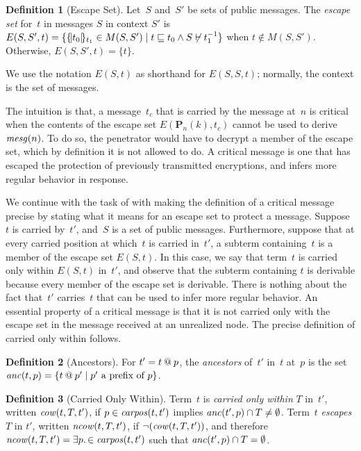 \documentclass[12pt]{article}
\theoremstyle{definition}
\newtheorem{defn}{Definition}[section]
\newcommand{\pubmsg}{\mathbf{P}}
\newcommand{\carpos}{\fn{carpos}}
\newcommand{\anc}{\fn{anc}}
\newcommand{\mcow}{\fn{cow}}
\newcommand{\mncow}{\fn{ncow}}
\begin{document}
\begin{defn}[Escape Set]
Let~$S$ and~$S'$ be sets of public messages.  
The \emph{escape set} for~$t$ in messages $S$ in context $S'$ is 
$E(S,S',t)=\{\{\!|t_0|\!\}_{t_1}\in M(S,S') \mid
t\sqsubseteq t_0\wedge S\not\vdash t^{-1}_1\}$ when $t\notin M(S,S')$.
Otherwise, $E(S,S',t) = \{t \}$.
\end{defn}

We use the notation $E(S,t)$ as shorthand for $E(S,S,t)$; normally,
the context is the set of messages.

The intuition is that, a message~$t_c$ that is carried by the message
at~$n$ is critical when the contents of the escape set $E(\pubmsg_n(k),t_c)$ 
cannot be used to derive~$\operatorname{\mathit{mesg}}(n)$.  To do so, the penetrator would have 
to decrypt a member of the escape set, which by definition it is not allowed 
to do.  A critical message is one that has escaped the protection of
previously transmitted encryptions, and {\cpsa} infers more regular
behavior in response.

We continue with the task of with making the definition of a critical
message precise by stating what it means for an escape set to protect
a message.  Suppose~$t$ is carried by~$t'$, and~$S$ is a set of public
messages.  Furthermore, suppose that at every carried position at
which~$t$ is carried in~$t'$, a subterm containing~$t$ is a member of
the escape set $E(S,t)$.  In this case, we say that term~$t$ is
carried only within $E(S,t)$ in~$t'$, and observe that the subterm
containing $t$ is derivable because every member of the escape set is
derivable.  There is nothing about the fact that~$t'$ carries~$t$ that
can be used to infer more regular behavior.  An essential property of
a critical message is that it is not carried only with the escape set
in the message received at an unrealized node.  The precise definition
of carried only within follows.

\begin{defn}[Ancestors]
For $t'=t\mathbin{@} p$, the \emph{ancestors} of~$t'$ in~$t$ at~$p$ is the
set $\anc(t,p)=\{t\termat p'\mid \mbox{$p'$ a prefix
  of~$p$}\}$.
\end{defn}

\begin{defn}[Carried Only Within]
Term~$t$ is \emph{carried only within} $T$ in~$t'$, written
$\mcow(t,T,t')$, if $p\in\carpos(t,t')$ implies
$\anc(t',p)\cap T\neq\emptyset$. Term~$t$ \emph{escapes} $T$ in $t'$, 
written $\mncow(t,T,t')$, if
$\lnot(\mcow(t,T,t'))$, and therefore $\mncow(t,T,t')=\some{p} \in
\carpos(t,t')$ such that $\anc(t',p)\cap T=\emptyset$.
\end{defn}
\end{document}
